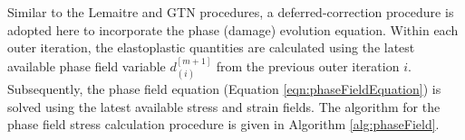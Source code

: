 \documentclass[sn-mathphys,Numbered]{sn-jnl}%
\begin{document}

Similar to the Lemaitre and GTN procedures, a deferred-correction procedure is adopted here to incorporate the phase (damage) evolution equation.
Within each outer iteration, the elastoplastic quantities are calculated using the latest available phase field variable $d^{[m+1]}_{(i)}$ from the previous outer iteration $i$.
Subsequently, the phase field equation (Equation \ref{eqn:phaseFieldEquation}) is solved using the latest available stress and strain fields.
The algorithm for the phase field stress calculation procedure is given in Algorithm \ref{alg:phaseField}.
\end{document}
